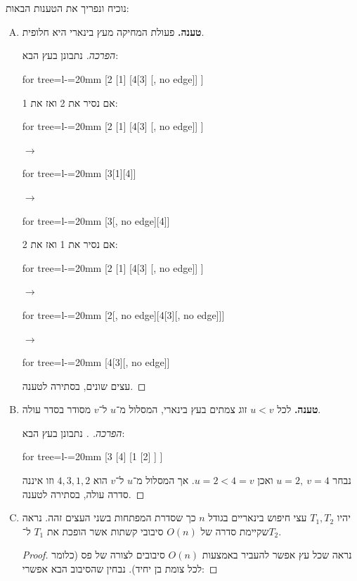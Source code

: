 \documentclass[]{article}
\newcommand\sen   {\begin{otherlanguage}{english}}
\newcommand\she   {\end{otherlanguage}}
\theoremstyle{definition}
\begin{document}
	\section{}
	נוכיח ונפריך את הטענות הבאות: 
	\begin{enumerate}[A.]
		\item \textbf{טענה. }פעולת המחיקה מעץ בינארי היא חלופית. \begin{proof}[הפרכה]
			נתבונן בעץ הבא: 
			\begin{center}
				\sen\begin{forest}
					{for tree={l-=20mm}}
					[2
						[1]
						[4[3] [, no edge]]
					]
				\end{forest}\she
			\end{center}
			אם נסיר את 2 ואז את 1: 
			\begin{center}
				 \sen\begin{forest}
				 	{for tree={l-=20mm}}
				 	[2
				 	[1]
				 	[4[3] [, no edge]]
				 	]
				 \end{forest}$\to$
				 \begin{forest}
				 	{for tree={l-=20mm}}
				 	[3[1][4]]
				 \end{forest}$\to$\begin{forest}
				 {for tree={l-=20mm}}
					 [3[, no edge][4]]
				 \end{forest}
				 \she
			\end{center}
			אם נסיר את 1 ואז את 2: 
			\begin{center}
				\sen\begin{forest}
					{for tree={l-=20mm}}
					[2
					[1]
					[4[3] [, no edge]]
					]
				\end{forest}$\to$\begin{forest}
					{for tree={l-=20mm}}
					[2[, no edge][4[3][, no edge]]]
				\end{forest}$\to$\begin{forest}
					{for tree={l-=20mm}}
					[4[3][, no edge]]
				\end{forest}\she
			\end{center}
			עצים שונים, בסתירה לטענה. 
		\end{proof}
		\item \textbf{טענה. }לכל $u < v$ זוג צמתים בעץ בינארי, המסלול מ־$u$ ל־$v$ מסודר בסדר עולה. \begin{proof}[הפרכה. ]
			נתבונן בעץ הבא: 
			\sen\begin{center}\begin{forest}
					{for tree={l-=20mm}}
					[3
						[4]
						[1
							[2]
						]
					]
			\end{forest}\end{center}\she
			נבחר $u = 2, \ v = 4$ ואכן $u = 2 < 4 = v$. אך המסלול מ־$u$ ל־$v$ הוא $4, 3, 1, 2$ וזו איננה סדרה עולה, בסתירה לטענה. 
		\end{proof}
		\item יהיו $T_1, T_2$ עצי חיפוש בינאריים בגודל $n$ כך שסדרת המפתחות בשני העצים זהה. נראה שקיימת סדרה של $O(n)$ סיבובי קשתות אשר הופכת את $T_1$ ל־$T_2$. \begin{proof}
			נראה שכל עץ אפשר להעביר באמצעות $O(n)$ סיבובים לצורה של פס (כלומר לכל צומת בן יחיד). נבחין שהסיבוב הבא אפשרי: 
			

\end{proof}
\end{enumerate}
\end{document}
